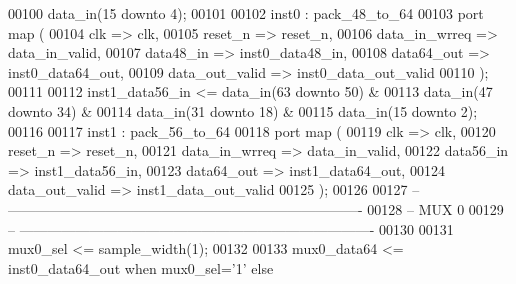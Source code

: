 \begin{DoxyCode}
00100                      \textcolor{vhdlchar}{data_in}\textcolor{vhdlchar}{(}\textcolor{vhdllogic}{}\textcolor{vhdllogic}{15} \textcolor{keywordflow}{downto} \textcolor{vhdllogic}{}\textcolor{vhdllogic}{4}\textcolor{vhdlchar}{)};
00101 
00102 inst0 : pack_48_to_64 
00103 \textcolor{keywordflow}{port} \textcolor{keywordflow}{map} (
00104       clk               => clk,
00105       reset_n           => reset_n,
00106       data_in_wrreq     => data_in_valid,
00107       data48_in         => inst0_data48_in,
00108       data64_out        => inst0_data64_out,
00109       data_out_valid    => inst0_data_out_valid
00110 \textcolor{vhdlchar}{)};
00111 
00112 inst1\_data56\_in <=   data\_in(\textcolor{vhdllogic}{63} \textcolor{keywordflow}{downto} \textcolor{vhdllogic}{50}) &
00113                      \textcolor{vhdlchar}{data_in}\textcolor{vhdlchar}{(}\textcolor{vhdllogic}{}\textcolor{vhdllogic}{47} \textcolor{keywordflow}{downto} \textcolor{vhdllogic}{}\textcolor{vhdllogic}{34}\textcolor{vhdlchar}{)} \textcolor{vhdlchar}{&} 
00114                      \textcolor{vhdlchar}{data_in}\textcolor{vhdlchar}{(}\textcolor{vhdllogic}{}\textcolor{vhdllogic}{31} \textcolor{keywordflow}{downto} \textcolor{vhdllogic}{}\textcolor{vhdllogic}{18}\textcolor{vhdlchar}{)} \textcolor{vhdlchar}{&} 
00115                      \textcolor{vhdlchar}{data_in}\textcolor{vhdlchar}{(}\textcolor{vhdllogic}{}\textcolor{vhdllogic}{15} \textcolor{keywordflow}{downto} \textcolor{vhdllogic}{}\textcolor{vhdllogic}{2}\textcolor{vhdlchar}{)};
00116 
00117 inst1 : pack_56_to_64 
00118 \textcolor{keywordflow}{port} \textcolor{keywordflow}{map} (
00119       clk            => clk,
00120       reset_n        => reset_n,
00121       data_in_wrreq  => data_in_valid,
00122       data56_in      => inst1_data56_in,
00123       data64_out     => inst1_data64_out,
00124       data_out_valid => inst1_data_out_valid
00125 \textcolor{vhdlchar}{)};
00126 
00127 \textcolor{keyword}{-- ----------------------------------------------------------------------------}
00128 \textcolor{keyword}{-- MUX 0 }
00129 \textcolor{keyword}{-- ----------------------------------------------------------------------------}
00130 
00131 \textcolor{vhdlchar}{mux0_sel}                \textcolor{vhdlchar}{<=} \textcolor{vhdlchar}{sample_width}\textcolor{vhdlchar}{(}\textcolor{vhdllogic}{}\textcolor{vhdllogic}{1}\textcolor{vhdlchar}{)};
00132 
00133 \textcolor{vhdlchar}{mux0_data64}             \textcolor{vhdlchar}{<=} \textcolor{vhdlchar}{inst0_data64_out} \textcolor{keywordflow}{when} \textcolor{vhdlchar}{mux0_sel}\textcolor{vhdlchar}{=}\textcolor{vhdlchar}{'}\textcolor{vhdllogic}{}\textcolor{vhdllogic}{1}\textcolor{vhdlchar}{'} \textcolor{keywordflow}{else} 

\end{DoxyCode}

